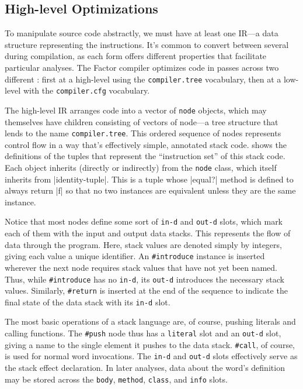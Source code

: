 \subsection{High-level Optimizations}\label{sec:compiler:tree}

To manipulate source code abstractly, we must have at least one \gls{IR}---a
data structure representing the instructions.  It's common to convert between
several  during compilation, as each form offers different
properties that facilitate particular analyses.  The Factor compiler optimizes
code in passes across two different : first at a high-level using
the \Verb|compiler.tree| vocabulary, then at a low-level with the
\Verb|compiler.cfg| vocabulary.


The high-level \gls{IR} arranges code into a vector of \Verb|node| objects,
which may themselves have children consisting of vectors of node---a tree
structure that lends to the name \Verb|compiler.tree|.  This ordered sequence
of nodes represents control flow in a way that's effectively simple, annotated
stack code.   shows the definitions of the tuples that represent
the ``instruction set'' of this stack code.  Each object inherits (directly or
indirectly) from the \Verb|node| class, which itself inherits from
\factor|identity-tuple|.  This is a tuple whose \factor|equal?| method is
defined to always return \factor|f| so that no two instances are equivalent
unless they are the same instance.

Notice that most nodes define some sort of \Verb|in-d| and \Verb|out-d|
slots, which mark each of them with the input and output data stacks.  This
represents the flow of data through the program.  Here, stack values are
denoted simply by integers, giving each value a unique identifier.  An
\Verb|#introduce| instance is inserted wherever the next node requires stack
values that have not yet been named.  Thus, while \Verb|#introduce| has no
\Verb|in-d|, its \Verb|out-d| introduces the necessary stack values.
Similarly, \Verb|#return| is inserted at the end of the sequence to indicate
the final state of the data stack with its \Verb|in-d| slot.

The most basic operations of a stack language are, of course, pushing literals
and calling functions.  The \Verb|#push| node thus has a \Verb|literal|
slot and an \Verb|out-d| slot, giving a name to the single element it pushes
to the data stack.  \Verb|#call|, of course, is used for normal word
invocations.  The \Verb|in-d| and \Verb|out-d| slots effectively serve as
the stack effect declaration.  In later analyses, data about the word's
definition may be stored across the \Verb|body|, \Verb|method|,
\Verb|class|, and \Verb|info| slots.

